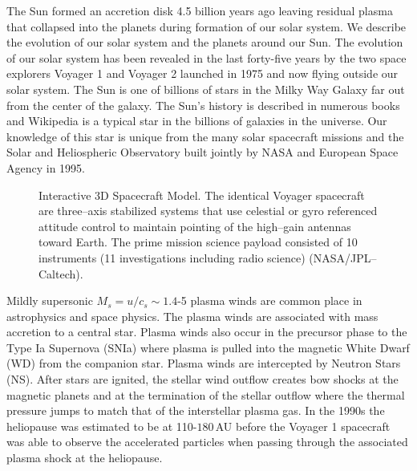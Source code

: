 \documentclass[a4paper,openany,12pt]{book}
\begin{document}
The Sun formed an accretion disk 4.5 billion years ago leaving residual plasma that collapsed into the planets during formation of our solar system. We describe the evolution of our solar system and the planets around our Sun. The evolution of our solar system has been revealed in the last forty-five years by the two space explorers Voyager 1 and Voyager 2 launched in 1975 and now flying outside our solar system. The Sun is one of billions of stars in the Milky Way Galaxy far out from the center of the galaxy. The Sun's history is described in numerous books and Wikipedia is a typical star in the billions of galaxies in the universe. Our knowledge of this star is unique from the many solar spacecraft missions and the Solar and Heliospheric Observatory built jointly by NASA and European Space Agency in 1995.
\begin{figure}[H]
\centerline{}
\caption{Interactive 3D Spacecraft Model. The identical Voyager spacecraft are three--axis stabilized systems that use celestial or gyro referenced attitude control to maintain pointing of the high--gain antennas toward Earth. The prime mission science payload consisted of 10 instruments (11 investigations including radio science) (NASA/JPL--Caltech).}
\label{3dsc}
\end{figure}
%

%

Mildly supersonic $M_s=u/c_s\sim 1.4$-5 plasma winds are common place in astrophysics and space physics. The plasma winds are associated with mass accretion to a central star. Plasma winds also occur in the precursor phase to the Type Ia Supernova (SNIa) where plasma is pulled into the magnetic White Dwarf (WD) from the companion star. Plasma winds are intercepted by Neutron Stars (NS). After stars are ignited, the stellar wind outflow creates bow shocks at the magnetic planets and at the termination of the stellar outflow where the thermal pressure jumps to match that of the interstellar plasma gas. In the 1990s the heliopause was estimated to be at 110-$180\,$AU before the Voyager 1 spacecraft was able to observe the accelerated particles when passing through the associated plasma shock at the heliopause.
\end{document}
